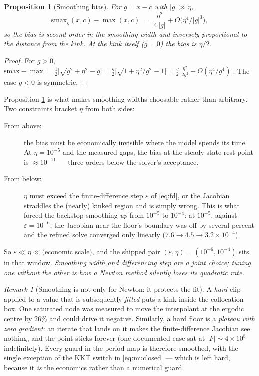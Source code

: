 \documentclass[10pt,a4paper]{article}
\theoremstyle{definition}
\theoremstyle{plain}
\newtheorem{prop}[defn]{Proposition}
\theoremstyle{remark}
\newtheorem{rem}[defn]{Remark}
\newcommand{\half}{\tfrac{1}{2}}
\begin{document}
\begin{prop}[Smoothing bias]
\label{prop:bias}
For $g = x - c$ with $|g| \gg \eta$,
\begin{equation}
  \mathrm{smax}_\eta(x,c) - \max(x,c) \;=\; \frac{\eta^2}{4\,|g|} + O\!\big(\eta^4/|g|^3\big),
\end{equation}
so the bias is \emph{second order} in the smoothing width and inversely proportional to the
distance from the kink. At the kink itself ($g=0$) the bias is $\eta/2$.
\end{prop}
\begin{proof}
For $g>0$, $\mathrm{smax} - \max = \half\big[\sqrt{g^2+\eta^2} - g\big] =
\tfrac{g}{2}\big[\sqrt{1+\eta^2/g^2}-1\big] = \tfrac{g}{2}\big[\tfrac{\eta^2}{2g^2} +
O(\eta^4/g^4)\big]$. The case $g<0$ is symmetric. \end{proof}

Proposition \ref{prop:bias} is what makes smoothing widths choosable rather than arbitrary.
Two constraints bracket $\eta$ from both sides:
\begin{description}
\item[From above:] the bias must be economically invisible where the model spends its time.
At $\eta = 10^{-5}$ and the measured gaps, the bias at the steady-state rest point is
$\approx 10^{-11}$ --- three orders below the solver's acceptance.
\item[From below:] $\eta$ must exceed the finite-difference step $\varepsilon$ of
\eqref{eq:fd}, or the Jacobian straddles the (nearly) kinked region and is simply wrong. This
is what forced the backstop smoothing \emph{up} from $10^{-5}$ to $10^{-4}$: at $10^{-5}$,
against $\varepsilon=10^{-6}$, the Jacobian near the floor's boundary was off by several
percent and the refined solve converged only linearly ($7.6\to4.5\to3.2\times10^{-4}$).
\end{description}
\noindent So $\varepsilon \ll \eta \ll \text{(economic scale)}$, and the shipped pair
$(\varepsilon,\eta) = (10^{-6}, 10^{-4})$ sits in that window. \emph{Smoothing width and
differencing step are a joint choice; tuning one without the other is how a Newton method
silently loses its quadratic rate.}

\begin{rem}[Smoothing is not only for Newton: it protects the fit]
A \emph{hard} clip applied to a value that is subsequently \emph{fitted} puts a kink inside
the collocation box. One saturated node was measured to move the interpolant at the ergodic
centre by $26\%$ and could drive it negative. Similarly, a hard floor is a \emph{plateau with
zero gradient}: an iterate that lands on it makes the finite-difference Jacobian see nothing,
and the point sticks forever (one documented case sat at $|F|\sim 4\times10^{8}$
indefinitely). Every guard in the period map is therefore smoothed, with the single exception
of the KKT switch in \eqref{eq:muclosed} --- which is left hard, because it \emph{is} the
economics rather than a numerical guard.
\end{rem}
\end{document}
